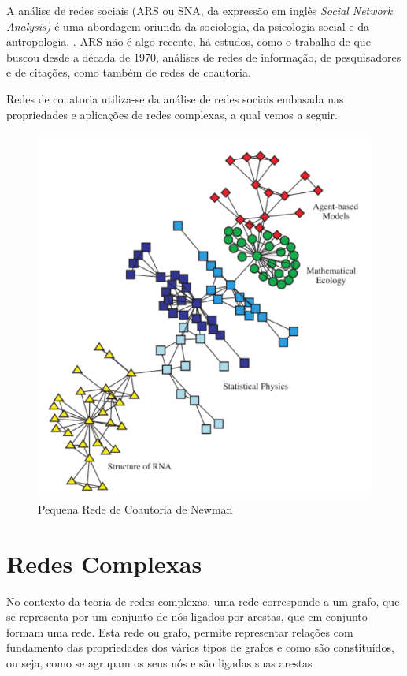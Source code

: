 A análise de redes sociais (ARS ou SNA, da expressão em inglês \textit{Social Network Analysis)} é uma abordagem oriunda da sociologia, da psicologia social e da antropologia. \citep{freeman1996some,wasserman1994social}. ARS não é algo recente, há estudos, como o trabalho de \citep{otte2002social} que buscou desde a década de 1970, análises de redes de informação, de pesquisadores e de citações, como também de redes de coautoria.

 Redes de couatoria utiliza-se da análise de redes sociais embasada nas propriedades e aplicações de redes complexas, a qual vemos a seguir.


\begin{figure}[H]
\centering
\includegraphics[scale=0.7]{Imagens/rede-newman.pdf}
\caption{Pequena Rede de Coautoria de Newman}
\label{rede1}
\end{figure}

\section{\textbf{Redes Complexas}}\label{sec:redes_complexas}

No contexto da teoria de redes complexas, uma rede corresponde a um grafo, que se representa por um conjunto de nós ligados por arestas, que em conjunto formam uma rede.  Esta rede ou grafo, permite representar relações com fundamento das propriedades dos vários tipos de grafos e como são constituídos, ou seja, como se agrupam os seus nós e são ligadas suas arestas %

